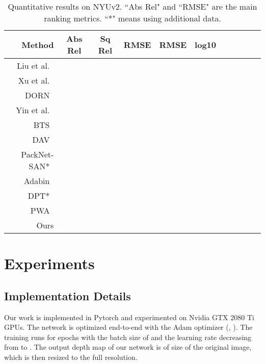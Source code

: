 \documentclass[10pt,twocolumn,letterpaper]{article}
\begin{document}
\setlength{\tabcolsep}{3pt}
\begin{table*}[]
\small
\centering
\begin{tabular}{r c c c c c c c c c c}
\toprule
Method & Abs Rel  & Sq Rel  & RMSE  & RMSE  & log10  &   &   &    \\
\midrule
Liu et al.~\cite{liu2015deep} &  &  &  &  &  &  &  & \\
Xu et al.~\cite{xu2018structured} &  &  &  &  &  &  &  & \\
DORN~\cite{fu2018deep} &  &  &  &  &  &  &  & \\
Yin et al.~\cite{yin2019enforcing} &  &  &  &  &  &  &  & \\
BTS~\cite{lee2019big} &  &  &  &  &  &  &  & \\
DAV~\cite{huynh2020guiding} &  &  &  &  &  &  &  & \\
PackNet-SAN*~\cite{guizilini2021sparse} &  &  &  &  &  &  &  & \\
Adabin~\cite{bhat2021adabins} &  &  &  &  &  &  &  & \\
DPT*~\cite{ranftl2021vision} &  &  &  &  &  &  &  & \\
PWA~\cite{lee2021patch} &  &  &  &  &  &  &  & \\
Ours &  &  &  &  &  &  &  & \\
\bottomrule
\end{tabular}
\vspace{-2mm}
\caption{Quantitative results on NYUv2. ``Abs Rel" and ``RMSE" are the main ranking metrics. ``*" means using additional data.}
\label{tab:nyu}
\vspace{-4mm}
\end{table*}
\setlength{\tabcolsep}{3pt}







\section{Experiments}
\label{sec:experiments}




\subsection{Implementation Details}

Our work is implemented in Pytorch and experimented on Nvidia GTX 2080 Ti GPUs. The network is optimized end-to-end with the Adam optimizer (, ). The training runs for  epochs with the batch size of  and the learning rate decreasing from  to . 
The output depth map of our network is of  size of the original image, which is then resized to the full resolution.
\end{document}
